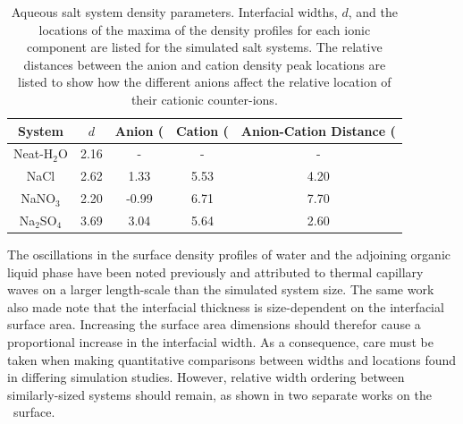 \begin{table}[htdp]
	\begin{center}
	\begin{tabular}{|c||c|c|c|c|}
		\hline
		System & $d$ & Anion (\ang) & Cation (\ang) & Anion-Cation Distance (\ang) \\ \hline
		Neat-H$_2$O & 2.16 & - & - & - \\ 
		NaCl & 2.62 & 1.33 & 5.53 & 4.20 \\
		NaNO$_3$ & 2.20 & -0.99 & 6.71 & 7.70 \\
		Na$_2$SO$_4$ & 3.69 & 3.04 & 5.64 & 2.60 \\
		\hline
	\end{tabular}
	\end{center}
	\caption{Aqueous salt system density parameters. Interfacial widths, $d$, and the locations of the maxima of the density profiles for each ionic component are listed for the simulated salt systems. The relative distances between the anion and cation density peak locations are listed to show how the different anions affect the relative location of their cationic counter-ions.}
	\label{table:double-layer}
\end{table}

The oscillations in the surface density profiles of water and the adjoining organic \ctc liquid phase have been noted previously and attributed to thermal capillary waves on a larger length-scale than the simulated system size.\cite{Chang1996} The same work also made note that the interfacial thickness is size-dependent on the interfacial surface area. Increasing the surface area dimensions should therefor cause a proportional increase in the interfacial width. As a consequence, care must be taken when making quantitative comparisons between widths and locations found in differing simulation studies. However, relative width ordering between similarly-sized systems should remain, as shown in two separate works on the \ctcwat~surface.\cite{Chang1996,Hore2008}


